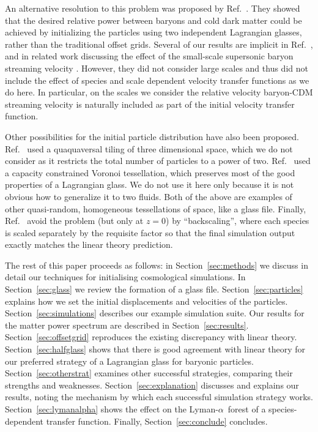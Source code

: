 \documentclass[a4paper,11pt]{article}
\newcommand{\Lya}{Lyman-$\alpha$}
\begin{document}
An alternative resolution to this problem was proposed by Ref.~\cite{Yoshida:2003}. They showed that the desired relative power between baryons and cold dark matter could be achieved by initializing the particles using two independent Lagrangian glasses, rather than the traditional offset grids. Several of our results are implicit in Ref.~\cite{Yoshida:2003}, and in related work discussing the effect of the small-scale supersonic baryon streaming velocity \cite{Naoz:2011}. However, they did not consider large scales and thus did not include the effect of species and scale dependent velocity transfer functions as we do here. In particular, on the scales we consider the relative velocity baryon-CDM streaming velocity \cite{TkHirata:2010} is naturally included as part of the initial velocity transfer function.


Other possibilities for the initial particle distribution have also been proposed. Ref.~\cite{Hansen:2007} used a quaquaversal tiling of three dimensional space, which we do not consider as it restricts the total number of particles to a power of two. Ref.~\cite{Liao:2018} used a capacity constrained Voronoi tessellation, which preserves most of the good properties of a Lagrangian glass. We do not use it here only because it is not obvious how to generalize it to two fluids. Both of the above are examples of other quasi-random, homogeneous tessellations of space, like a glass file. Finally, Ref.~\cite{Zennaro:2017} avoid the problem (but only at $z=0$) by ``backscaling'', where each species is scaled separately by the requisite factor so that the final simulation output exactly matches the linear theory prediction.

The rest of this paper proceeds as follows: in Section~\ref{sec:methods} we discuss in detail our techniques for initialising cosmological simulations. In Section~\ref{sec:glass} we review the formation of a glass file. Section~\ref{sec:particles} explains how we set the initial displacements and velocities of the particles. Section~\ref{sec:simulations} describes our example simulation suite. Our results for the matter power spectrum are described in Section~\ref{sec:results}. Section~\ref{sec:offsetgrid} reproduces the existing discrepancy with linear theory. Section~\ref{sec:halfglass} shows that there is good agreement with linear theory for our preferred strategy of a Lagrangian glass for baryonic particles. Section~\ref{sec:otherstrat} examines other successful strategies, comparing their strengths and weaknesses. Section~\ref{sec:explanation} discusses and explains our results, noting the mechanism by which each successful simulation strategy works.
Section~\ref{sec:lymanalpha} shows the effect on the \Lya~forest of a species-dependent transfer function.
Finally, Section~\ref{sec:conclude} concludes.
\end{document}
